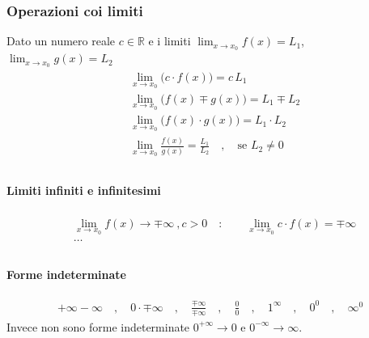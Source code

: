 \documentclass[letterpaper,10pt,english]{jupyterBook}
\begin{document}
\subsubsection{Operazioni coi limiti}
\label{\detokenize{ch/infinitesimal_calculus/analysis:operazioni-coi-limiti}}\label{\detokenize{ch/infinitesimal_calculus/analysis:infinitesimal-calculus-limits-thms-operations}}
\sphinxAtStartPar
Dato un numero reale \(c \in \mathbb{R}\) e i limiti \(\lim_{x \rightarrow x_0} f(x) = L_1\), \(\lim_{x \rightarrow x_0} g(x) = L_2\)
\begin{equation*}
\begin{split}\begin{aligned}
 & \lim_{x \rightarrow x_0} \big( c \cdot f(x) \big) = c \, L_1 \\
 & \lim_{x \rightarrow x_0} \big( f(x) \mp g(x) \big) = L_1 \mp L_2 \\
 & \lim_{x \rightarrow x_0} \big( f(x) \cdot g(x) \big) = L_1 \cdot L_2 \\
 & \lim_{x \rightarrow x_0} \frac{ f(x) }{ g(x) } = \frac{L_1}{L_2} \quad , \quad \text{se $L_2 \ne 0$}  \\
\end{aligned}\end{split}
\end{equation*}

\paragraph{Limiti infiniti e infinitesimi}
\label{\detokenize{ch/infinitesimal_calculus/analysis:limiti-infiniti-e-infinitesimi}}\label{\detokenize{ch/infinitesimal_calculus/analysis:infinitesimal-calculus-limits-thms-infinite-simal}}\begin{equation*}
\begin{split}\begin{aligned}
 &  \lim_{x \rightarrow x_0}f(x) \rightarrow \mp \infty \ , c > 0 \quad : \qquad \lim_{x \rightarrow x_0} c \cdot f(x) = \mp \infty \\
 & \dots \\
\end{aligned}\end{split}
\end{equation*}

\paragraph{Forme indeterminate}
\label{\detokenize{ch/infinitesimal_calculus/analysis:forme-indeterminate}}\label{\detokenize{ch/infinitesimal_calculus/analysis:infinitesimal-calculus-limits-thms-infinite-simal-undetermined}}\begin{equation*}
\begin{split}+\infty-\infty \quad , \quad 0 \cdot \mp \infty \quad , \quad \frac{\mp \infty}{\mp \infty} \quad , \quad \frac{0}{0} \quad , \quad 1^{\infty} \quad , \quad 0^0 \quad , \quad \infty^0\end{split}
\end{equation*}
\sphinxAtStartPar
{} Invece non sono forme indeterminate \(0^{+\infty} \rightarrow 0\) e \(0^{-\infty} \rightarrow \infty\).
\end{document}
